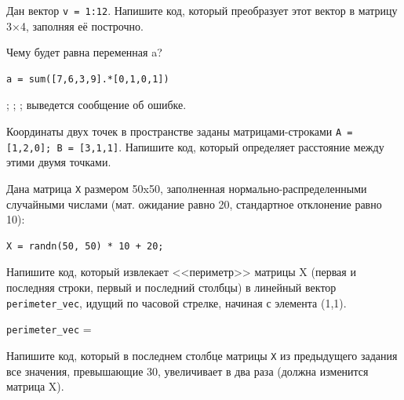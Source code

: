 \documentclass[addpoints,12pt]{exam}
\begin{document}
\begin{questions}
\question[1] Дан вектор \texttt{v = 1:12}. Напишите код, который преобразует этот вектор в матрицу 3×4, заполняя её построчно.
\begin{solutionorlines}[2cm]
\end{solutionorlines}

\question[1] Чему будет равна переменная a?
\begin{lstlisting}
a = sum([7,6,3,9].*[0,1,0,1])
\end{lstlisting}    
\begin{checkboxes}
;
;
;
\choice выведется сообщение об ошибке.
\end{checkboxes}

\question[1] Координаты двух точек в пространстве заданы матрицами-строками \texttt{A = [1,2,0]; B = [3,1,1]}. Напишите код, который определяет расстояние между этими двумя точками.
\begin{solutionorlines}[1cm]
\end{solutionorlines}

\question[1] 
Дана матрица \texttt{X} размером 50x50, заполненная нормально-распределенными случайными числами (мат. ожидание равно 20, стандартное отклонение равно 10): 
\begin{lstlisting}
X = randn(50, 50) * 10 + 20; 
\end{lstlisting}
Напишите код, который извлекает <<периметр>> матрицы X (первая и последняя строки, первый и последний столбцы) в линейный вектор \texttt{perimeter\_vec}, идущий по часовой стрелке, начиная с элемента (1,1).
\begin{solutionorlines}[3cm]
    \texttt{perimeter\_vec} = 
\end{solutionorlines}

\question[1] 
Напишите код, который в последнем столбце матрицы \texttt{X} из предыдущего задания все значения, превышающие 30, увеличивает в два раза (должна изменится матрица X).
\begin{solutionorlines}[2cm]
\end{solutionorlines}

\end{questions}


\vfill

\begin{center}
\gradetable[h][questions]
\end{center}
\end{document}

